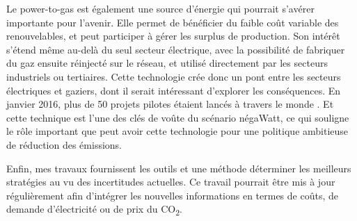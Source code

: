 Le power-to-gas est également une source d’énergie qui pourrait s’avérer importante pour l’avenir. Elle permet de bénéficier du faible coût variable des renouvelables, et peut participer à gérer les surplus de production. Son intérêt s’étend même au-delà du seul secteur électrique, avec la possibilité de fabriquer du gaz ensuite réinjecté sur le réseau, et utilisé directement par les secteurs industriels ou tertiaires. Cette technologie crée donc un pont entre les secteurs électriques et gaziers, dont il serait intéressant d’explorer les conséquences. En janvier 2016, plus de 50 projets pilotes étaient lancés à travers le monde \citep{EneaConsulting2016}. Et cette technique est l’une des clés de voûte du scénario négaWatt, ce qui souligne le rôle important que peut avoir cette technologie pour une politique ambitieuse de réduction des émissions.

Enfin, mes travaux fournissent les outils et une méthode déterminer les meilleurs stratégies au vu des incertitudes actuelles. Ce travail pourrait être mis à jour régulièrement afin d’intégrer les nouvelles informations en termes de coûts, de demande d’électricité ou de prix du CO\textsubscript{2}. 

